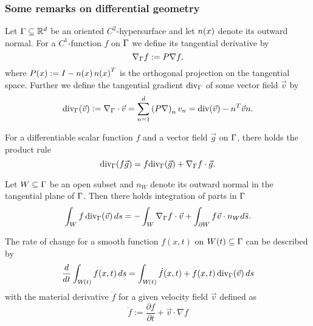 \subsubsection{Some remarks on differential geometry}
Let $\Gamma\subseteq\mathbb{R}^d$ be an oriented $C^2$-hypersurface and let $n\!\left(x\right)$ denote its outward normal.
For a $C^1$-function $f$ on $\Gamma$ we define its tangential derivative by
\begin{equation}
	\nabla_\Gamma f:=P\nabla f,
\end{equation}
where $P\!\left(x\right):=I-n\!\left(x\right)n\!\left(x\right)^T$ is the orthogonal projection on the tangential space. Further we define the tangential gradient $\text{div}_\Gamma$ of some vector field  $\vec v$ by
\begin{equation}
	\text{div}_\Gamma\!\left(\vec v\right):=\nabla_\Gamma \cdot \vec v=\sum_{n=1}^d \left(P\nabla\right)_n v_n=\text{div}\!\left(\vec v\right) - n^T\vec v n.
\end{equation}
\begin{rmk}
	For a differentiable scalar function $f$ and a vector field $\vec g$ on $\Gamma$, there holds the product rule
	\begin{equation}
		\textrm{div}_\Gamma\!\left(f\vec g\right)=f\mathrm{div}_\Gamma\!\left(\vec g\right)+\nabla_\Gamma f\cdot \vec g.
	\end{equation}
\end{rmk}
\begin{rmk}
	Let $W\subseteq\Gamma$ be an open subset and $n_W$ denote its outward normal in the tangential plane of $\Gamma$. Then there holds integration of parts in $\Gamma$
	\begin{equation}
		\int_Wf\,\mathrm{div}_\Gamma\!\left(\vec v\right)ds=-\int_W\nabla_\Gamma f\cdot\vec v+\int_{\partial W}f \vec v \cdot n_W d\tilde s.
	\end{equation}
\end{rmk}

\begin{thm}
The rate of change for a smooth function $f(x,t)$ on $W\!\left(t\right)\subseteq \Gamma$ can be described by
\begin{equation}
	\frac{d}{dt}\int_{W\!\left(t\right)}f\!\left(x,t\right)ds=\int_{W\!\left(t\right)}\dot f\!\left(x,t\right)+f\!\left(x,t\right)\mathrm{div}_\Gamma\!\left(\vec v\right)ds
\end{equation}
with the material derivative $\dot f$ for a given velocity field $\vec v$ defined as
\begin{equation}
\dot f:=\frac{\partial f}{\partial t}+\vec v\cdot\nabla f
\end{equation}
\end{thm}
